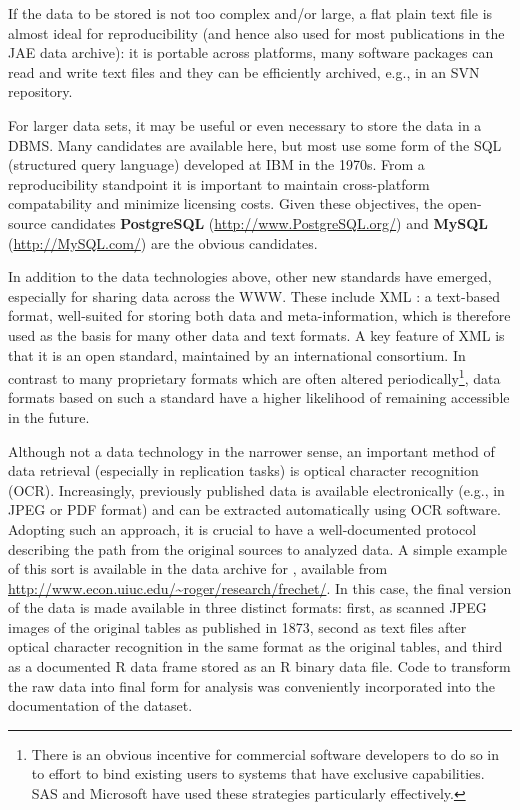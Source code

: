 \documentclass[10pt,a4paper,twoside]{article}
\let\pkg=\textbf
\let\proglang=\textsf
\begin{document}
If the data to be stored is not too complex and/or large, a flat plain text file
is almost ideal for reproducibility (and hence also used for most publications in the
JAE data archive): it is portable across platforms, many software
packages can read and write text files and they can be efficiently archived, e.g.,
in an SVN repository.

For larger data sets, it may be useful or even necessary to store the data
in a DBMS. Many candidates are available here, but most use
some form of the \proglang{SQL} (structured query language) developed at IBM in the 1970s.  From
a reproducibility standpoint it is important to maintain cross-platform compatability
and minimize licensing costs.  Given these objectives, the 
open-source candidates \pkg{PostgreSQL} (\url{http://www.PostgreSQL.org/}) and
\pkg{MySQL} (\url{http://MySQL.com/}) are the obvious candidates.

In addition to the data technologies above, other new standards have emerged,
especially for sharing data across the WWW. These include 
\proglang{XML} \citep[extensible markup language,][]{repro:Bray+Paoli+SperbergMcQueen:2006}:
a text-based format,
well-suited for storing both data and meta-information, which is therefore used
as the basis for many other data and text formats. A key feature of \proglang{XML}
is that it is an open standard, maintained by an international consortium.
In contrast to many proprietary formats which are often altered
periodically\footnote{There is an obvious incentive
for commercial software developers to do so in to effort to bind existing users to 
systems that have exclusive capabilities. \proglang{SAS} and Microsoft have used
these strategies particularly effectively.}, data formats based on such a standard
have a higher likelihood of remaining accessible in the future. 

Although not a data technology in the narrower sense, an important method of
data retrieval (especially in replication tasks) is optical character recognition
(OCR). Increasingly, previously published data is available electronically
(e.g., in JPEG or PDF format) and can be extracted automatically using OCR software.
Adopting such an approach, it is crucial to have a well-documented protocol
describing the path from the original sources to analyzed data.  A simple example
of this sort is available in the data archive for \cite{repro:Koenker:2006},
available from \url{http://www.econ.uiuc.edu/~roger/research/frechet/}.
In this case, the final version of the data is made available in three distinct
formats: first, as scanned JPEG images of the original tables as published in 1873,
second as text files after optical character recognition in the same format as the
original tables, and third as a documented \proglang{R} data frame stored
as an \proglang{R} binary data file. Code to transform the raw data into final form
for analysis was conveniently incorporated into the documentation of the dataset.
\end{document}

